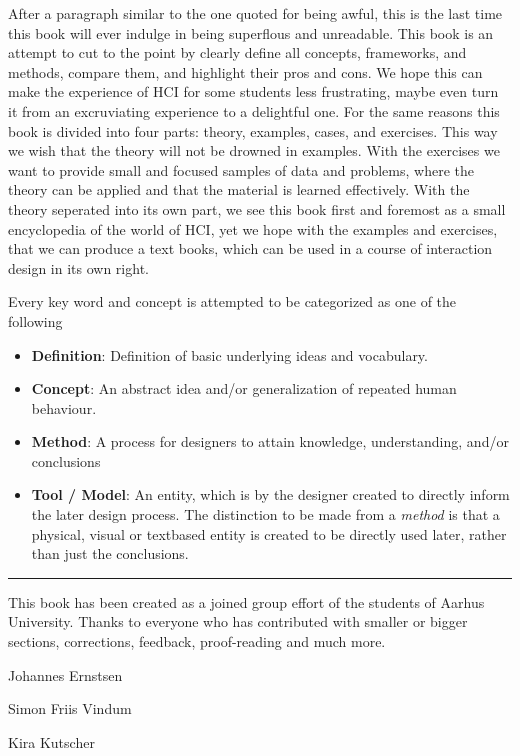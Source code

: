 After a paragraph similar to the one quoted for being awful, this is the last time this book will ever indulge in being superflous and unreadable. This book is an attempt to cut to the point by clearly define all concepts, frameworks, and methods, compare them, and highlight their pros and cons. We hope this can make the experience of HCI for some students less frustrating, maybe even turn it from an excruviating experience to a delightful one. For the same reasons this book is divided into four parts: theory, examples, cases, and exercises. This way we wish that the theory will not be drowned in examples. With the exercises we want to provide small and focused samples of data and problems, where the theory can be applied and that the material is learned effectively. With the theory seperated into its own part, we see this book first and foremost as a small encyclopedia of the world of HCI, yet we hope with the examples and exercises, that we can produce a text books, which can be used in a course of interaction design in its own right.

Every key word and concept is attempted to be categorized as one of the following
\begin{itemize}
   \item \textbf{Definition}: Definition of basic underlying ideas and vocabulary.

   \item \textbf{Concept}: An abstract idea and/or generalization of repeated human behaviour.


   \item \textbf{Method}: A process for designers to attain knowledge, understanding, and/or conclusions

   \item \textbf{Tool / Model}: An entity, which is by the designer created to directly inform the later design process. The distinction to be made from a \emph{method} is that a physical, visual or textbased entity is created to be directly used later, rather than just the conclusions.
\end{itemize}

\vspace{2em}
\noindent\hfil\rule{0.8\textwidth}{.4pt}\hfil

\vspace{2em}
\noindent This book has been created as a joined group effort of the students of Aarhus University. Thanks to everyone who has contributed with smaller or bigger sections, corrections, feedback, proof-reading and much more.

\begin{multicols}{2}
  Johannes Ernstsen

  Simon Friis Vindum
  
  \hfill
  \columnbreak
  
  Kira Kutscher
\end{multicols}

